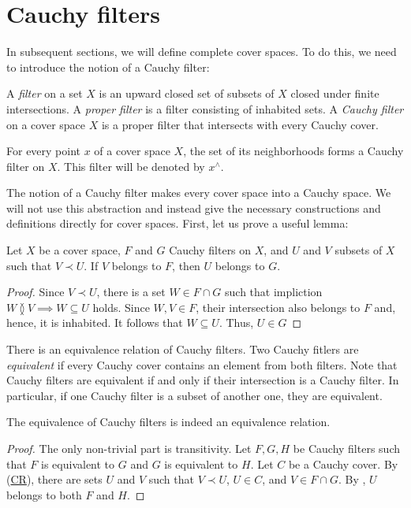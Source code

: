 \documentclass[reqno]{amsart}
\newcommand{\axref}[1]{(\hyperref[ax:#1]{#1})}
\theoremstyle{definition}
\theoremstyle{remark}
\numberwithin{figure}{section}
\newcommand{\overlap}[2]{#1 \between #2}
\newcommand{\rb}{\prec}
\begin{document}
\section{Cauchy filters}

In subsequent sections, we will define complete cover spaces.
To do this, we need to introduce the notion of a Cauchy filter:

\begin{defn}
A \emph{filter} on a set $X$ is an upward closed set of subsets of $X$ closed under finite intersections.
A \emph{proper filter} is a filter consisting of inhabited sets.
A \emph{Cauchy filter} on a cover space $X$ is a proper filter that intersects with every Cauchy cover.
\end{defn}

\begin{example}
For every point $x$ of a cover space $X$, the set of its neighborhoods forms a Cauchy filter on $X$.
This filter will be denoted by $x^\wedge$.
\end{example}

The notion of a Cauchy filter makes every cover space into a Cauchy space. %
We will not use this abstraction and instead give the necessary constructions and definitions directly for cover spaces.
First, let us prove a useful lemma:

\begin{lem}
Let $X$ be a cover space, $F$ and $G$ Cauchy filters on $X$, and $U$ and $V$ subsets of $X$ such that $V \rb U$.
If $V$ belongs to $F$, then $U$ belongs to $G$.
\end{lem}
\begin{proof}
Since $V \rb U$, there is a set $W \in F \cap G$ such that impliction $\overlap{W}{V} \implies W \subseteq U$ holds.
Since $W,V \in F$, their intersection also belongs to $F$ and, hence, it is inhabited.
It follows that $W \subseteq U$.
Thus, $U \in G$
\end{proof}

There is an equivalence relation of Cauchy filters.
Two Cauchy fitlers are \emph{equivalent} if every Cauchy cover contains an element from both filters.
Note that Cauchy filters are equivalent if and only if their intersection is a Cauchy filter.
In particular, if one Cauchy filter is a subset of another one, they are equivalent.

\begin{prop}
The equivalence of Cauchy filters is indeed an equivalence relation.
\end{prop}
\begin{proof}
The only non-trivial part is transitivity.
Let $F,G,H$ be Cauchy filters such that $F$ is equivalent to $G$ and $G$ is equivalent to $H$.
Let $C$ be a Cauchy cover.
By \axref{CR}, there are sets $U$ and $V$ such that $V \rb U$, $U \in C$, and $V \in F \cap G$.
By , $U$ belongs to both $F$ and $H$.
\end{proof}
\end{document}
